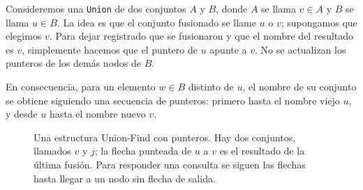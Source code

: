 \documentclass[12pt, spanish, oneside, openany]{book}
\theoremstyle{uprightplain}
\theoremstyle{definition}
\theoremstyle{remark}
\theoremstyle{definition}
\begin{document}
Consideremos una \texttt{Union} de dos conjuntos $A$ y $B$, donde $A$ se llama $v \in A$ y $B$ se llama $u \in B$. La idea es que el conjunto fusionado se llame $u$ o $v$; supongamos que elegimos $v$. Para dejar registrado que se fusionaron y que el nombre del resultado es $v$, simplemente hacemos que el puntero de $u$ apunte a $v$. No se actualizan los punteros de los demás nodos de $B$.

En consecuencia, para un elemento $w \in B$ distinto de $u$, el nombre de su conjunto se obtiene siguiendo una secuencia de punteros: primero hasta el nombre viejo $u$, y desde $u$ hasta el nombre nuevo $v$.

\begin{figure}[H]
\centering
{}
\caption{Una estructura Union-Find con punteros. Hay dos conjuntos, llamados
$v$ y $j$; la flecha punteada de $u$ a $v$ es el resultado de la última fusión.
Para responder una consulta se siguen las flechas hasta llegar a un nodo sin
flecha de salida.}
\label{fig:union-find}
\end{figure}
\end{document}
